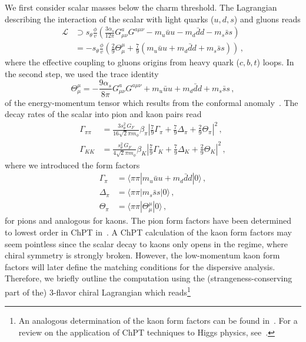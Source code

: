 \documentclass[preprintnumbers,twocolumn,aps,floats,nofootinbib]{revtex4-1}
\begin{document}
We first consider scalar masses below the charm threshold. The Lagrangian describing the interaction of the scalar with light quarks ($u,d,s$) and gluons reads
\begin{align}
  \mathcal{L} &\supset  s_{\theta}\frac{\phi}{v} \left( \frac{3\alpha_s}{12\pi}G^{a}_{\mu\nu}G^{a\mu\nu}  - m_u\bar{u}u - m_d\bar{d}d - m_s\bar{s}s\right)\nonumber\\
&= - s_{\theta}\frac{\phi}{v} \left( \frac{2}{9}\Theta_\mu^\mu +  \frac{7}{9} \left(m_u\bar{u}u+m_d\bar{d}d+m_s\bar{s}s\right)\right)\,,
\end{align}
where the effective coupling to gluons origins from heavy quark ($c,b,t$) loops. In the second step, we used the trace identity 
\begin{equation}
 \Theta_\mu^\mu = -\frac{9\alpha_s}{8\pi} G^{a}_{\mu\nu}G^{a\mu\nu}  + m_u\bar{u}u + m_d\bar{d}d + m_s\bar{s}s\,,
\end{equation}
of the energy-momentum tensor which results from the conformal anomaly~\cite{Crewther:1972kn,Chanowitz:1972vd}. The decay rates of the scalar into pion and kaon pairs read
\begin{align}
\Gamma_{\pi\pi}&= \frac{3s_{\theta}^2\, G_F}{16\sqrt{2}\pi m_\phi}\beta_\pi \left|\tfrac{7}{9}\Gamma_\pi + \tfrac{7}{9}\Delta_\pi+ \tfrac{2}{9}\Theta_\pi\right|^2\,,\nonumber\\
\Gamma_{KK}&= \frac{s_{\theta}^2\,G_F}{4\sqrt{2}\pi m_\phi}\beta_K \left|\tfrac{7}{9}\Gamma_K + \tfrac{7}{9}\Delta_K+ \tfrac{2}{9}\Theta_K\right|^2\,,
\end{align}
where we introduced the form factors
\begin{align}
 \Gamma_\pi &= \langle \pi\pi | m_u \bar{u} u+m_d \bar{d} d|0\rangle\,,\nonumber\\
 \Delta_\pi &= \langle \pi\pi | m_s \bar{s} s|0\rangle\,,\nonumber\\
 \Theta_\pi &= \langle \pi\pi | \Theta_\mu^\mu|0\rangle\,,
\end{align}
for pions and analogous for kaons. The pion form factors have been determined to lowest order in ChPT in~\cite{Voloshin:1985tc}. A ChPT calculation of the kaon form factors may seem pointless since the scalar decay to kaons only opens in the regime, where chiral symmetry is strongly broken. However, the low-momentum kaon form factors will later define the matching conditions for the dispersive analysis. Therefore, we briefly outline the computation using the (strangeness-conserving part of the) 3-flavor chiral Lagrangian which reads\footnote{An analogous determination of the kaon form factors can be found in~\cite{Donoghue:1990xh}. For a review on the application of ChPT techniques to Higgs physics, see~\cite{Dawson:1989yh,Gunion:1989we}.}
\end{document}
